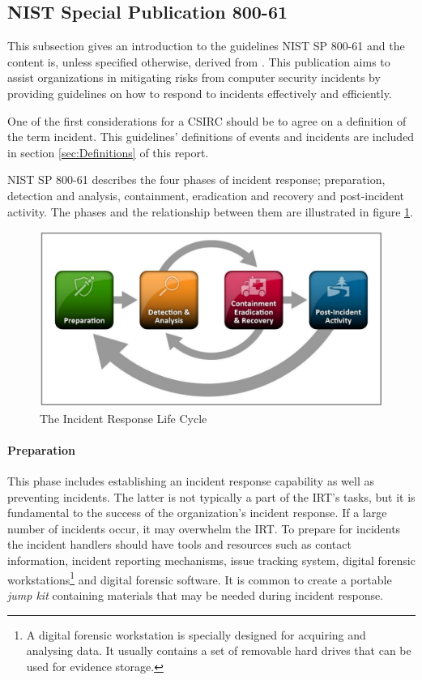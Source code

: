\subsection{\acs{NIST} Special Publication 800-61}
This subsection gives an introduction to the guidelines \acs{NIST} SP 800-61 and the content is, unless specified otherwise, derived from \cite{nist800-61}. This publication aims to  assist organizations in mitigating risks from computer security incidents by providing guidelines on how to respond to incidents effectively and efficiently. 

One of the first considerations for a \ac{CSIRC} should be to agree on a definition of the term incident. This guidelines' definitions of events and incidents are included in section \ref{sec:Definitions} of this report. 

\acs{NIST} SP 800-61 describes the four phases of incident response; preparation, detection and analysis, containment, eradication and recovery and post-incident activity. The phases and the relationship between them are illustrated in figure \ref{fig:NISTIncidentResponse}.

\begin{figure}[ht]
\begin{center}
\includegraphics[scale=0.27]{NISTIncidentResponseCycle.png}
\caption[The Incident Response Life Cycle]{The Incident Response Life Cycle \cite{nist800-61}}
\label{fig:NISTIncidentResponse}
\end{center}
\end{figure}

\paragraph{Preparation} 
This phase includes establishing an incident response capability as well as preventing incidents. The latter is not typically a part of the \ac{IRT}'s tasks, but it is fundamental to the success of the organization's incident response. If a large number of incidents occur, it may overwhelm the \ac{IRT}. To prepare for incidents the incident handlers should have tools and resources such as contact information, incident reporting mechanisms, issue tracking system, digital forensic workstations\footnote{A digital forensic workstation is specially designed for acquiring and analysing data. It usually contains a set of removable hard drives that can be used for evidence storage.} and digital forensic software. It is common to create a portable \emph{jump kit} containing materials that may be needed during incident response.

